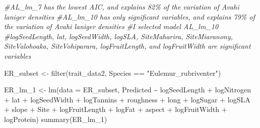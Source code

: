 \documentclass[
  12pt,
]{article}
\newenvironment{Shaded}{\begin{snugshade}}{\end{snugshade}}
\newcommand{\AttributeTok}[1]{\textcolor[rgb]{0.77,0.63,0.00}{#1}}
\newcommand{\CommentTok}[1]{\textcolor[rgb]{0.56,0.35,0.01}{\textit{#1}}}
\newcommand{\FunctionTok}[1]{\textcolor[rgb]{0.00,0.00,0.00}{#1}}
\newcommand{\NormalTok}[1]{#1}
\newcommand{\OtherTok}[1]{\textcolor[rgb]{0.56,0.35,0.01}{#1}}
\newcommand{\SpecialCharTok}[1]{\textcolor[rgb]{0.00,0.00,0.00}{#1}}
\newcommand{\StringTok}[1]{\textcolor[rgb]{0.31,0.60,0.02}{#1}}
\begin{document}
\begin{Shaded}
\begin{Highlighting}[]
\CommentTok{\#AL\_lm\_7 has the lowest AIC, and explains 82\% of the variation of Avahi laniger densities }
\CommentTok{\#AL\_lm\_10 has only significant variables, and explains 79\% of the variation of Avahi laniger densities}
\CommentTok{\#I selected model AL\_lm\_10}
\CommentTok{\#logSeedLength, lat, logSeedWidth, logSLA, SiteMaharira, SiteMiaranony, SiteValohoaka, SiteVohiparara, logFruitLength, and logFruitWidth are significant variables}

\NormalTok{ER\_subset }\OtherTok{\textless{}{-}} \FunctionTok{filter}\NormalTok{(trait\_data2, Species }\SpecialCharTok{==} \StringTok{"Eulemur\_rubriventer"}\NormalTok{)}

\NormalTok{ER\_lm\_1 }\OtherTok{\textless{}{-}} \FunctionTok{lm}\NormalTok{(}\AttributeTok{data =}\NormalTok{ ER\_subset, Predicted }\SpecialCharTok{\textasciitilde{}}\NormalTok{ logSeedLength }\SpecialCharTok{+}\NormalTok{ logNitrogen }\SpecialCharTok{+}\NormalTok{ lat }\SpecialCharTok{+}\NormalTok{ logSeedWidth }\SpecialCharTok{+}\NormalTok{ logTannins }\SpecialCharTok{+}\NormalTok{ roughness }\SpecialCharTok{+}\NormalTok{ long }\SpecialCharTok{+}\NormalTok{ logSugar }\SpecialCharTok{+}\NormalTok{ logSLA }\SpecialCharTok{+}\NormalTok{ slope }\SpecialCharTok{+}\NormalTok{ Site }\SpecialCharTok{+}\NormalTok{ logFruitLength }\SpecialCharTok{+}\NormalTok{ logFat }\SpecialCharTok{+}\NormalTok{ aspect }\SpecialCharTok{+}\NormalTok{ logFruitWidth }\SpecialCharTok{+}\NormalTok{ logProtein)}
\FunctionTok{summary}\NormalTok{(ER\_lm\_1)}
\end{Highlighting}
\end{Shaded}
\end{document}
